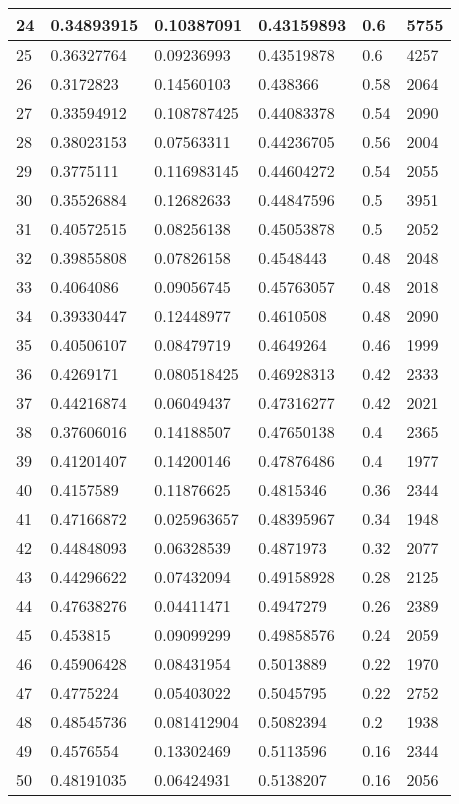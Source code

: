 \begin{longtable}{|l|l|l|l|l|l|}
24 & 0.34893915 & 0.10387091 & 0.43159893 & 0.6 & 5755 \\ \hline 
25 & 0.36327764 & 0.09236993 & 0.43519878 & 0.6 & 4257 \\ \hline 
26 & 0.3172823 & 0.14560103 & 0.438366 & 0.58 & 2064 \\ \hline 
27 & 0.33594912 & 0.108787425 & 0.44083378 & 0.54 & 2090 \\ \hline 
28 & 0.38023153 & 0.07563311 & 0.44236705 & 0.56 & 2004 \\ \hline 
29 & 0.3775111 & 0.116983145 & 0.44604272 & 0.54 & 2055 \\ \hline 
30 & 0.35526884 & 0.12682633 & 0.44847596 & 0.5 & 3951 \\ \hline 
31 & 0.40572515 & 0.08256138 & 0.45053878 & 0.5 & 2052 \\ \hline 
32 & 0.39855808 & 0.07826158 & 0.4548443 & 0.48 & 2048 \\ \hline 
33 & 0.4064086 & 0.09056745 & 0.45763057 & 0.48 & 2018 \\ \hline 
34 & 0.39330447 & 0.12448977 & 0.4610508 & 0.48 & 2090 \\ \hline 
35 & 0.40506107 & 0.08479719 & 0.4649264 & 0.46 & 1999 \\ \hline 
36 & 0.4269171 & 0.080518425 & 0.46928313 & 0.42 & 2333 \\ \hline 
37 & 0.44216874 & 0.06049437 & 0.47316277 & 0.42 & 2021 \\ \hline 
38 & 0.37606016 & 0.14188507 & 0.47650138 & 0.4 & 2365 \\ \hline 
39 & 0.41201407 & 0.14200146 & 0.47876486 & 0.4 & 1977 \\ \hline 
40 & 0.4157589 & 0.11876625 & 0.4815346 & 0.36 & 2344 \\ \hline 
41 & 0.47166872 & 0.025963657 & 0.48395967 & 0.34 & 1948 \\ \hline 
42 & 0.44848093 & 0.06328539 & 0.4871973 & 0.32 & 2077 \\ \hline 
43 & 0.44296622 & 0.07432094 & 0.49158928 & 0.28 & 2125 \\ \hline 
44 & 0.47638276 & 0.04411471 & 0.4947279 & 0.26 & 2389 \\ \hline 
45 & 0.453815 & 0.09099299 & 0.49858576 & 0.24 & 2059 \\ \hline 
46 & 0.45906428 & 0.08431954 & 0.5013889 & 0.22 & 1970 \\ \hline 
47 & 0.4775224 & 0.05403022 & 0.5045795 & 0.22 & 2752 \\ \hline 
48 & 0.48545736 & 0.081412904 & 0.5082394 & 0.2 & 1938 \\ \hline 
49 & 0.4576554 & 0.13302469 & 0.5113596 & 0.16 & 2344 \\ \hline 
50 & 0.48191035 & 0.06424931 & 0.5138207 & 0.16 & 2056 \\ \hline 
\end{longtable}
